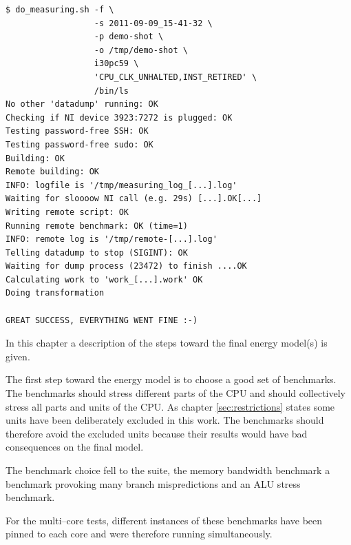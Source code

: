 \begin{lstlisting}[style=Shell]
$ do_measuring.sh -f \
                  -s 2011-09-09_15-41-32 \
                  -p demo-shot \
                  -o /tmp/demo-shot \
                  i30pc59 \
                  'CPU_CLK_UNHALTED,INST_RETIRED' \
                  /bin/ls
No other 'datadump' running: OK
Checking if NI device 3923:7272 is plugged: OK
Testing password-free SSH: OK
Testing password-free sudo: OK
Building: OK
Remote building: OK
INFO: logfile is '/tmp/measuring_log_[...].log'
Waiting for sloooow NI call (e.g. 29s) [...].OK[...]
Writing remote script: OK
Running remote benchmark: OK (time=1)
INFO: remote log is '/tmp/remote-[...].log'
Telling datadump to stop (SIGINT): OK
Waiting for dump process (23472) to finish ....OK
Calculating work to 'work_[...].work' OK
Doing transformation

GREAT SUCCESS, EVERYTHING WENT FINE :-)
\end{lstlisting}




\label{sec:towards-the-model}

In this chapter a description of the steps toward the final energy model(s) is
given.


\label{sec:benchmarks}

The first step toward the energy model is to choose a good set of benchmarks.
The benchmarks should stress different parts of the CPU and should collectively
stress all parts and units of the CPU. As chapter \ref{sec:restrictions} states
some units have been deliberately excluded in this work. The benchmarks should
therefore avoid the excluded units because their results would have bad
consequences on the final model.

The benchmark choice fell to the \JWTLspec{} suite, the memory bandwidth
benchmark \JWTLstream{} a benchmark provoking many branch mispredictions
and an ALU stress benchmark.

For the multi--core tests, different instances of these benchmarks have been
pinned to each core and were therefore running simultaneously.


\label{sec:finding-useful-subset}

